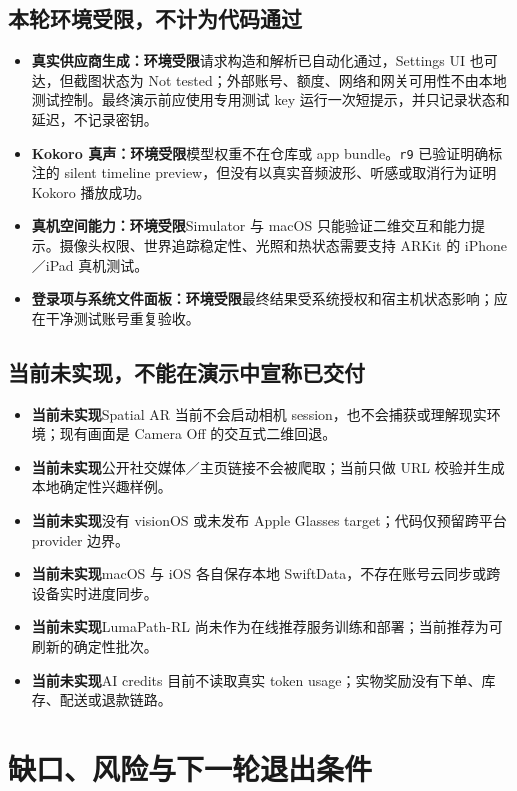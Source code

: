 \documentclass[10pt,a4paper,fontset=none]{ctexart}
\newcommand{\code}[1]{\begingroup\urlstyle{tt}\nolinkurl{#1}\endgroup}
\newcommand{\pill}[3]{\begingroup\setlength{\fboxsep}{3pt}\colorbox{#1}{\textcolor{#2}{\sffamily\bfseries\scriptsize #3}}\endgroup}
\newcommand{\Limited}{\pill{AmberPale}{Amber}{环境受限}}
\newcommand{\NotImplemented}{\pill{GrayPale}{Muted}{当前未实现}}
\begin{document}
\subsection{本轮环境受限，不计为代码通过}
\begin{itemize}
  \item \textbf{真实供应商生成：}\Limited\quad 请求构造和解析已自动化通过，Settings UI 也可达，但截图状态为 Not tested；外部账号、额度、网络和网关可用性不由本地测试控制。最终演示前应使用专用测试 key 运行一次短提示，并只记录状态和延迟，不记录密钥。
  \item \textbf{Kokoro 真声：}\Limited\quad 模型权重不在仓库或 app bundle。\code{r9} 已验证明确标注的 silent timeline preview，但没有以真实音频波形、听感或取消行为证明 Kokoro 播放成功。
  \item \textbf{真机空间能力：}\Limited\quad Simulator 与 macOS 只能验证二维交互和能力提示。摄像头权限、世界追踪稳定性、光照和热状态需要支持 ARKit 的 iPhone／iPad 真机测试。
  \item \textbf{登录项与系统文件面板：}\Limited\quad 最终结果受系统授权和宿主机状态影响；应在干净测试账号重复验收。
\end{itemize}

\subsection{当前未实现，不能在演示中宣称已交付}
\begin{itemize}
  \item \NotImplemented\quad Spatial AR 当前不会启动相机 session，也不会捕获或理解现实环境；现有画面是 Camera Off 的交互式二维回退。
  \item \NotImplemented\quad 公开社交媒体／主页链接不会被爬取；当前只做 URL 校验并生成本地确定性兴趣样例。
  \item \NotImplemented\quad 没有 visionOS 或未发布 Apple Glasses target；代码仅预留跨平台 provider 边界。
  \item \NotImplemented\quad macOS 与 iOS 各自保存本地 SwiftData，不存在账号云同步或跨设备实时进度同步。
  \item \NotImplemented\quad LumaPath-RL 尚未作为在线推荐服务训练和部署；当前推荐为可刷新的确定性批次。
  \item \NotImplemented\quad AI credits 目前不读取真实 token usage；实物奖励没有下单、库存、配送或退款链路。
\end{itemize}

\section{缺口、风险与下一轮退出条件}
\end{document}
